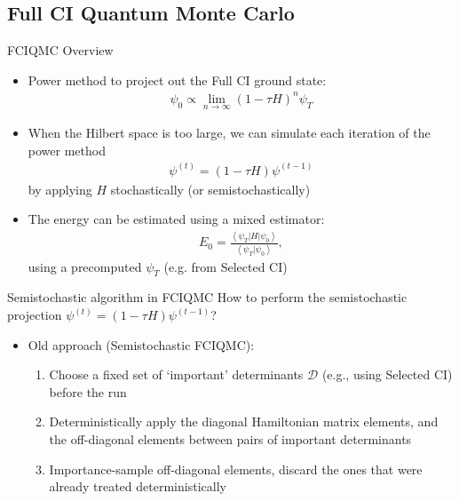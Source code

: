 \documentclass[amsmath]{beamer}
\begin{document}
\subsection{Full CI Quantum Monte Carlo}
\begin{frame}{FCIQMC Overview}
	\begin{itemize}
	\item Power method to project out the Full CI ground state:
	\begin{eqnarray}
		\psi_0 \propto \lim_{n\rightarrow\infty} (1 - \tau H)^n \psi_T
	\end{eqnarray}
	\item When the Hilbert space is too large, we can simulate each iteration of the power method
	\begin{eqnarray}
		\psi^{(t)} = (1 - \tau H)\psi^{(t-1)}
	\end{eqnarray}
	by applying $H$ stochastically (or semistochastically)
	\linebreak
	\item The energy can be estimated using a mixed estimator:
	\begin{eqnarray}
		E_0 = \frac{\left\langle\psi_T\left|H\right|\psi_0\right\rangle}{\left\langle\psi_T\vert \psi_0\right\rangle},
	\end{eqnarray}
	using a precomputed $\psi_T$ (e.g. from Selected CI)	
	\end{itemize}
\end{frame}

\begin{frame}{Semistochastic algorithm in FCIQMC}
	How to perform the semistochastic projection $\psi^{(t)} = (1-\tau H)\psi^{(t-1)}$?
	\begin{itemize}
		\item Old approach (Semistochastic FCIQMC):
		\begin{enumerate}
			\item Choose a fixed set of `important' determinants $\mathcal{D}$ (e.g., using Selected CI) before the run
			\item Deterministically apply the diagonal Hamiltonian matrix elements, and the off-diagonal elements between pairs of important determinants
			\item Importance-sample off-diagonal elements, discard the ones that were already treated deterministically
		\end{enumerate}
	\end{itemize}
\end{frame}
\end{document}
